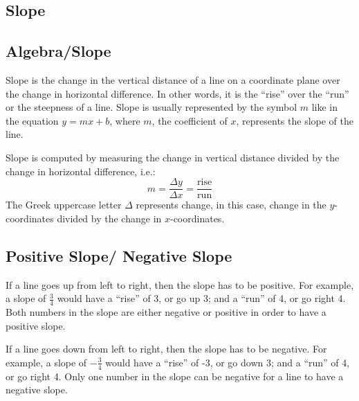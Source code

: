 \subsection{Slope}
\label{sss:slop-0bbe}

\subsection{Algebra/Slope}
\label{sss:alge-547c}

Slope is the change in the vertical distance of a line on a coordinate plane over the change in horizontal difference. In other words, it is the “rise” over the “run” or the steepness of a line. Slope is usually represented by the symbol $m$ like in the equation $y = mx + b$, where $m$, the coefficient of $x$, represents the slope of the line.

Slope is computed by measuring the change in vertical distance divided by the change in
horizontal difference, i.e.:
\[
m = \frac{\Delta y}{\Delta x} = \frac{\text{rise}}{\text{run}}
\]
The Greek uppercase letter $\Delta$ represents change, in this case, change in the $y$-coordinates divided by the change in $x$-coordinates.

\subsection{Positive Slope/ Negative Slope}
\label{sss:posi-9cc1}

If a line goes up from left to right, then the slope has to be positive. For example, a slope of $\frac{3}{4}$ would have a “rise” of 3, or go up 3; and a “run” of 4, or go right 4. Both numbers in the slope are either negative or positive in order to have a positive slope.

If a line goes down from left to right, then the slope has to be negative. For example, a slope of $-\frac{3}{4}$ would have a “rise” of -3, or go down 3; and a “run” of 4, or go right 4. Only one number in the slope can be negative for a line to have a negative slope.

